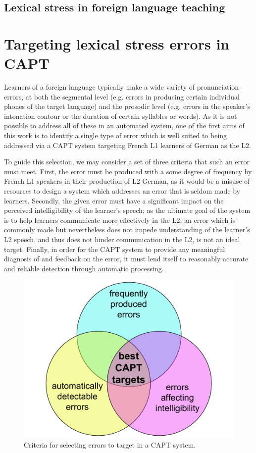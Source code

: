 		\subsection{Lexical stress in foreign language teaching}
		
		
 \section{Targeting lexical stress errors in CAPT}
 	Learners of a foreign language typically make a wide variety of pronunciation errors, at both the segmental level (e.g. errors in producing certain individual phones of the target language) and the prosodic level (e.g. errors in the speaker's intonation contour or the duration of certain syllables or words). As it is not possible to address all of these in an automated system, one of the first aims of this work is to identify a single type of error which is well suited to being addressed via a CAPT system targeting French L1 learners of German as the L2. 
	
	To guide this selection, we may consider %
a set of three criteria that such an error must meet. First, the error must be produced with a some degree of frequency by French L1 speakers in their production of L2 German, as it would be a misuse of resources to design a system which addresses an error that is seldom made by learners. Secondly, the given error must have a significant impact on the perceived intelligibility of the learner's speech; as the ultimate goal of the system is to help learners communicate more effectively in the L2, an error which is commonly made but nevertheless does not impede understanding of the learner's L2 speech, and thus does not hinder communication in the L2, is not an ideal target. Finally, in order for the CAPT system to provide any meaningful diagnosis of and feedback on the error, it must lend itself to reasonably accurate and reliable  detection through automatic processing. 
	
		\begin{figure}[htb]
			\centering
			\includegraphics[width=.7\textwidth]{../img/error-venn}
			\caption{Criteria for selecting errors to target in a CAPT system.}
			\label{fig:errors}
		\end{figure}
	
